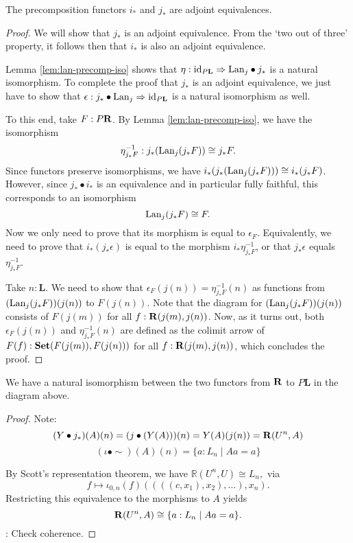 \begin{lemma}
  The precomposition functors $ i_* $ and $ j_* $ are adjoint equivalences.
\end{lemma}
\begin{proof}
  We will show that $ j_* $ is an adjoint equivalence. From the `two out of three' property, it follows then that $ i_* $ is also an adjoint equivalence.

  Lemma \ref{lem:lan-precomp-iso} shows that $ \eta: \text{id}_{P \mathbf L} \Rightarrow \text{Lan}_{j} \bullet j_* $ is a natural isomorphism. To complete the proof that $ j_* $ is an adjoint equivalence, we just have to show that $ \epsilon: j_* \bullet \text{Lan}_{j} \Rightarrow \text{id}_{P \mathbf L} $ is a natural isomorphism as well.

  To this end, take $ F : P \mathbf{R} $. By Lemma \ref{lem:lan-precomp-iso}, we have the isomorphism
  \[ \eta^{-1}_{j_* F}: j_* (\text{Lan}_{j}(j_* F)) \cong j_* F. \]
  Since functors preserve isomorphisms, we have $ i_* (j_* (\text{Lan}_{j}(j_* F))) \cong i_* (j_* F) $. However, since $ j_* \bullet i_* $ is an equivalence and in particular fully faithful, this corresponds to an isomorphism
  \[ \text{Lan}_{j}(j_* F) \cong F. \]
  Now we only need to prove that its morphism is equal to $ \epsilon_F $. Equivalently, we need to prove that $ i_* (j_* \epsilon) $ is equal to the morphism $ i_* \eta_{j_* F}^{-1} $, or that $ j_* \epsilon $ equals $ \eta^{-1}_{j_* F} $.

  Take $ n : \mathbf L $. We need to show that $ \epsilon_F (j(n)) = \eta_{j_* F}^{-1}(n) $ as functions from $ (\text{Lan}_{j} (j_* F)) (j(n)) $ to $ F(j(n)) $. Note that the diagram for $ (\text{Lan}_{j} (j_* F)) (j(n)) $ consists of $ F(j(m)) $ for all $ f: \mathbf{R}(j(m), j(n)) $. Now, as it turns out, both $ \epsilon_F (j(n)) $ and $ \eta_{j_* F}^{-1}(n) $ are defined as the colimit arrow of $ F(f) : \mathbf{Set}(F(j(m)), F(j(n))) $ for all $ f: \mathbf{R}(j(m), j(n)) $, which concludes the proof.
\end{proof}

\begin{lemma}
  We have a natural isomorphism between the two functors from $ \mathbf{R} $ to $ P \mathbf L $ in the diagram above.
\end{lemma}
\begin{proof}
  Note:
  \[ (Y \bullet j_*)(A)(n) = (j \bullet (Y(A)))(n) = Y(A)(j(n)) = \mathbf{R}(U^n, A) \]
  \[ (\iota \bullet \sim)(A)(n) = \{ a : L_n \mid A a = a \} \]

  By Scott's representation theorem, we have $ \mathbb R(U^n, U) \cong L_n, $ via
  \[ f \mapsto \iota_{0, n}(f) ((((c, x_1), x_2), \dots), x_n). \]
  Restricting this equivalence to the morphisms to $ A $ yields
  \[ \mathbf{R}(U^n, A) \cong \{ a : L_n \mid A a = a \}. \]
  \TODO: Check coherence.
\end{proof}

